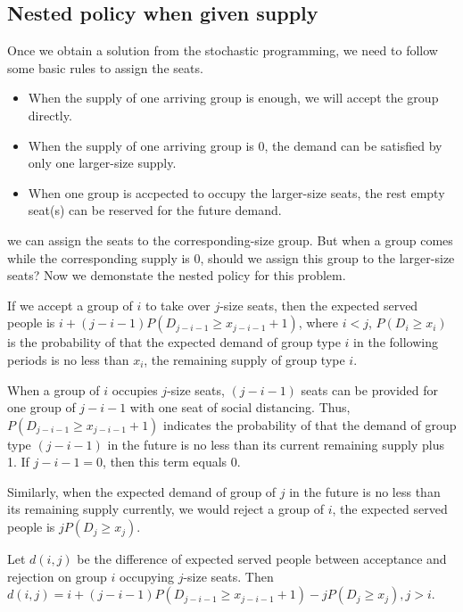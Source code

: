 \subsection{Nested policy when given supply}\label{nested_policy}

Once we obtain a solution from the stochastic programming, we need to follow some basic rules to assign the seats.
\begin{itemize}
    \item When the supply of one arriving group is enough, we will accept the group directly.
    \item When the supply of one arriving group is 0, the demand can be satisfied by only one larger-size supply.
    \item When one group is accpected to occupy the larger-size seats, the rest empty seat(s) can be reserved for the future demand.
\end{itemize}

we can assign the seats to the corresponding-size group. But when a group comes while the corresponding supply is 0, should we assign this group to the larger-size seats? Now we demonstate the nested policy for this problem.

If we accept a group of $i$ to take over $j$-size seats, then the expected served people is $i + (j-i-1)P(D_{j-i-1} \geq x_{j-i-1}+1)$, where $i < j$, $P(D_i \geq x_i)$ is the probability of that the expected demand of group type $i$ in the following periods is no less than $x_i$, the remaining supply of group type $i$.

When a group of $i$ occupies $j$-size seats, $(j-i-1)$ seats can be provided for one group of $j-i-1$ with one seat of social distancing.
Thus, $P(D_{j-i-1} \geq x_{j-i-1}+1)$ indicates the probability of that the demand of group type $(j-i-1)$ in the future is no less than its current remaining supply plus 1. If $j -i-1 =0$, then this term equals 0.

Similarly, when the expected demand of group of $j$ in the future is no less than its remaining supply currently, we would reject a group of $i$, the expected served people is $j P(D_{j} \geq x_{j})$.

Let $d(i,j)$ be the difference of expected served people between acceptance and rejection on group $i$ occupying $j$-size seats. Then $d(i,j) = i + (j-i-1)P(D_{j-i-1} \geq x_{j-i-1}+1) - j P(D_{j} \geq x_{j}), j >i$.

